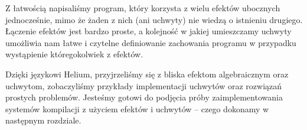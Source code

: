 

Z łatwością napisaliśmy program, który korzysta z wielu efektów ubocznych jednocześnie, mimo że żaden z nich (ani uchwyty) nie wiedzą o istnieniu drugiego. Łączenie efektów jest bardzo proste, a kolejność w jakiej umieszczamy uchwyty umożliwia nam łatwe i czytelne definiowanie zachowania programu w przypadku wystąpienie któregokolwiek z efektów.

Dzięki językowi Helium, przyjrzeliśmy się z bliska efektom algebraicznym oraz uchwytom, zobaczyliśmy przykłady implementacji uchwytów oraz rozwiązań prostych problemów. Jesteśmy gotowi do podjęcia próby zaimplementowania systemów kompilacji z użyciem efektów i uchwytów -- czego dokonamy w następnym rozdziale.
